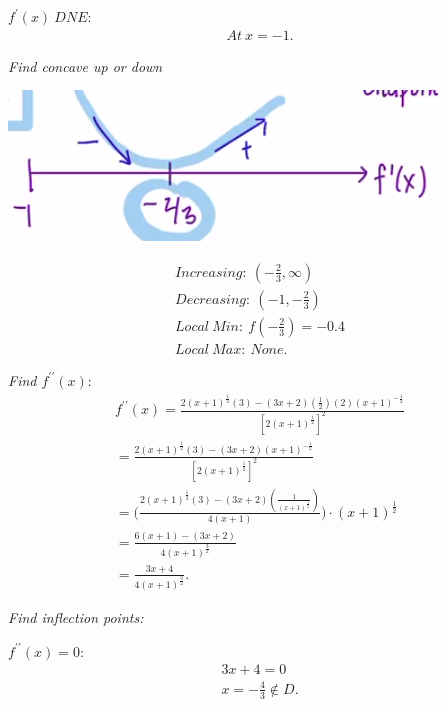 \documentclass{report}
\begin{document}
  \bigbreak \noindent \bigbreak \noindent 
  \textit{$f^{\prime}(x)\ DNE $}:
  \begin{align*}
   At\ x= -1 
  .\end{align*}

  \bigbreak \noindent 

  \bigbreak \noindent 
  \textit{Find concave up or down}

  \bigbreak \noindent 
  \begin{center}
    \includegraphics[scale=0.8]{ ./images/6.png }
  \end{center}

  \begin{align*}
    Increasing:\ (-\frac{2}{3}, \infty) \\
    Decreasing:\ (-1, -\frac{2}{3}) \\
    Local\ Min:\ f(-\frac{2}{3}) = -0.4 \\
    Local\ Max:\ None
  .\end{align*}

  \bigbreak \noindent 
  \textit{Find $f^{\prime\prime}(x) $}:
  \begin{align*}
    f^{\prime\prime}(x) = \frac{2(x+1)^{\frac{1}{2}}(3) - (3x+2)(\frac{1}{2})(2)(x+1)^{-\frac{1}{2}}}{[2(x+1)^{\frac{1}{2}}]^{2}} \\
    = \frac{2(x+1)^{\frac{1}{2}}(3) - (3x+2)(x+1)^{-\frac{1}{2}}}{[2(x+1)^{\frac{1}{2}}]^{2}} \\
    = \bigg(\frac{2(x+1)^{\frac{1}{2}}(3) - (3x+2)(\frac{1}{(x+1)^{\frac{1}{2}}})}{4(x+1)}\bigg) \cdot (x+1)^{\frac{1}{2}} \\
    = \frac{6(x+1)-(3x+2)}{4(x+1)^{\frac{3}{2}}} \\
    = \frac{3x+4}{4(x+1)^{\frac{3}{2}}}
  .\end{align*}

  \bigbreak \noindent 
  \textit{Find inflection points:}

  \bigbreak \noindent 
  \textit{$f^{\prime\prime}(x) = 0 $}:
  \begin{align*}
    3x+4 = 0 \\
    x = -\frac{4}{3} \notin D
  .\end{align*}
\end{document}
